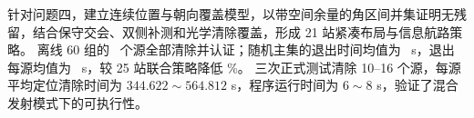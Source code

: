 
{\heiti 针对问题四}\songti，建立{\heiti 连续位置与朝向覆盖模型}\songti，以带空间余量的角区间并集证明无残留，结合保守交会、双侧补测和光学清除覆盖，形成 21 站紧凑布局与信息航路策略。
离线 60 组的 \QFourSourceTotal\ 个源全部清除并认证；随机主集的{\heiti 退出时间均值为 \QFourExitTime\ s}\songti，退出每源均值为 \QFourExitPerSource\ s，较 25 站联合策略降低 \QFourSaving\%。
三次正式测试清除 10--16 个源，{\heiti 每源平均定位清除时间为 $344.622\sim564.812$ s，程序运行时间为 $6\sim8$ s}\songti，验证了混合发射模式下的可执行性。

